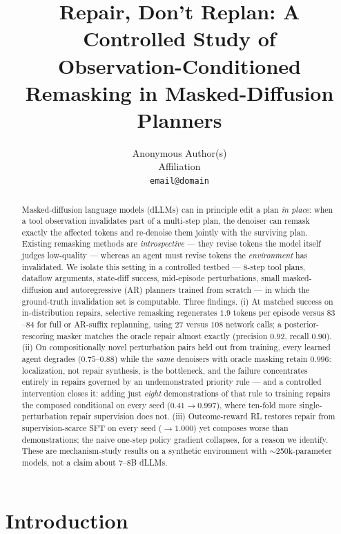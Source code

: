 \documentclass{article}
\title{Repair, Don't Replan: A Controlled Study of\\Observation-Conditioned Remasking in Masked-Diffusion Planners}
\author{%
  Anonymous Author(s)\\
  Affiliation\\
  \texttt{email@domain}
}
\begin{document}
\maketitle

\begin{abstract}
Masked-diffusion language models (dLLMs) can in principle edit a plan \emph{in place}: when a tool
observation invalidates part of a multi-step plan, the denoiser can remask exactly the affected
tokens and re-denoise them jointly with the surviving plan. Existing remasking methods are
\emph{introspective} --- they revise tokens the model itself judges low-quality --- whereas an agent
must revise tokens the \emph{environment} has invalidated. We isolate this setting in a controlled testbed --- 8-step tool plans, dataflow arguments,
state-diff success, mid-episode perturbations, small masked-diffusion and autoregressive (AR)
planners trained from scratch --- in which the ground-truth invalidation set is computable. Three findings. (i) At matched
success on in-distribution repairs, selective remasking regenerates $1.9$ tokens per episode versus
$83$--$84$ for full or AR-suffix replanning, using $27$ versus $108$ network calls; a
posterior-rescoring masker matches the oracle repair almost exactly (precision $0.92$, recall
$0.90$). (ii) On compositionally novel perturbation pairs held out from training, every learned
agent degrades ($0.75$--$0.88$) while the \emph{same} denoisers with oracle masking retain $0.996$:
localization, not repair synthesis, is the bottleneck, and the failure concentrates entirely in
repairs governed by an undemonstrated priority rule --- and a controlled intervention closes it:
adding just \emph{eight} demonstrations of that rule to training repairs the composed conditional on
every seed ($0.41\!\to\!0.997$), where ten-fold more single-perturbation repair supervision does
not. (iii) Outcome-reward RL restores repair from
supervision-scarce SFT on every seed ($\to 1.000$) yet composes worse than demonstrations; the naive
one-step policy gradient collapses, for a reason we identify. These are mechanism-study results on a
synthetic environment with $\sim$250k-parameter models, not a claim about 7--8B dLLMs.
\end{abstract}

\section{Introduction}
\end{document}
